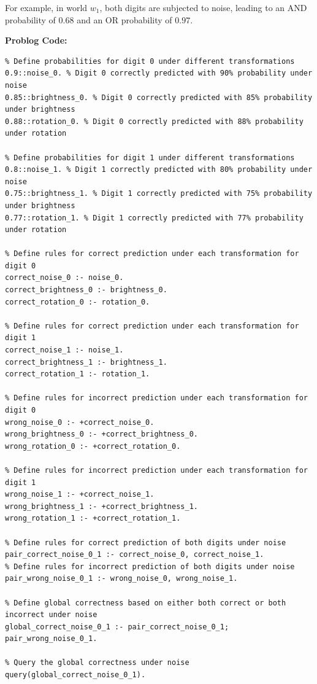 For example, in world $w_1$, both digits are subjected to noise, leading to an AND probability of $0.68$ and an OR probability of $0.97$.

\textbf{Problog Code:}
\begin{mdframed}[leftline=false, rightline=false, topline=true, bottomline=true]
\scriptsize
\begin{verbatim}
% Define probabilities for digit 0 under different transformations
0.9::noise_0. % Digit 0 correctly predicted with 90% probability under noise
0.85::brightness_0. % Digit 0 correctly predicted with 85% probability under brightness
0.88::rotation_0. % Digit 0 correctly predicted with 88% probability under rotation

% Define probabilities for digit 1 under different transformations
0.8::noise_1. % Digit 1 correctly predicted with 80% probability under noise
0.75::brightness_1. % Digit 1 correctly predicted with 75% probability under brightness
0.77::rotation_1. % Digit 1 correctly predicted with 77% probability under rotation

% Define rules for correct prediction under each transformation for digit 0
correct_noise_0 :- noise_0.
correct_brightness_0 :- brightness_0.
correct_rotation_0 :- rotation_0.

% Define rules for correct prediction under each transformation for digit 1
correct_noise_1 :- noise_1.
correct_brightness_1 :- brightness_1.
correct_rotation_1 :- rotation_1.

% Define rules for incorrect prediction under each transformation for digit 0
wrong_noise_0 :- +correct_noise_0.
wrong_brightness_0 :- +correct_brightness_0.
wrong_rotation_0 :- +correct_rotation_0.

% Define rules for incorrect prediction under each transformation for digit 1
wrong_noise_1 :- +correct_noise_1.
wrong_brightness_1 :- +correct_brightness_1.
wrong_rotation_1 :- +correct_rotation_1.

% Define rules for correct prediction of both digits under noise
pair_correct_noise_0_1 :- correct_noise_0, correct_noise_1.
% Define rules for incorrect prediction of both digits under noise
pair_wrong_noise_0_1 :- wrong_noise_0, wrong_noise_1.

% Define global correctness based on either both correct or both incorrect under noise
global_correct_noise_0_1 :- pair_correct_noise_0_1; pair_wrong_noise_0_1.

% Query the global correctness under noise
query(global_correct_noise_0_1).
\end{verbatim}
\end{mdframed}

